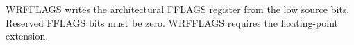 WRFFLAGS writes the architectural FFLAGS register from the low source bits. Reserved FFLAGS bits must be zero. WRFFLAGS requires the floating-point extension.
